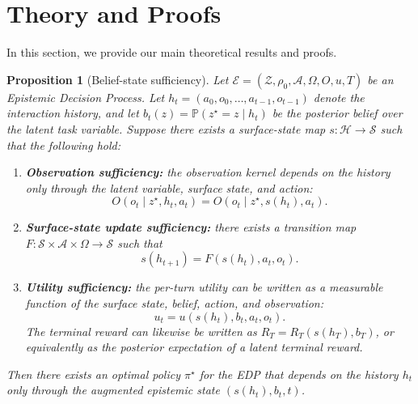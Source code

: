 \documentclass[11pt]{article}
\theoremstyle{plain}
\newtheorem{proposition}[theorem]{Proposition}
\theoremstyle{definition}
\theoremstyle{remark}
\begin{document}
\appendix

\section{Theory and Proofs}
\label{app:proofs}
In this section, we provide our main theoretical results and proofs. 
\begin{proposition}[Belief-state sufficiency]
\label{prop:belief-state-sufficiency}
Let \(\mathcal{E}=(\mathcal{Z},\rho_0,\mathcal{A},\Omega,O,u,T)\) be an Epistemic Decision Process. Let \(h_t=(a_0,o_0,\ldots,a_{t-1},o_{t-1})\) denote the interaction history, and let \(b_t(z)=\mathbb{P}(z^\star=z\mid h_t)\) be the posterior belief over the latent task variable. Suppose there exists a surface-state map \(s:\mathcal{H}\rightarrow\mathcal{S}\) such that the following hold:
\begin{enumerate}
    \item \textbf{Observation sufficiency:} the observation kernel depends on the history only through the latent variable, surface state, and action:
    \[
        O(o_t\mid z^\star,h_t,a_t)=O(o_t\mid z^\star,s(h_t),a_t).
    \]
    \item \textbf{Surface-state update sufficiency:} there exists a transition map \(F:\mathcal{S}\times\mathcal{A}\times\Omega\rightarrow\mathcal{S}\) such that
    \[
        s(h_{t+1})=F(s(h_t),a_t,o_t).
    \]
    \item \textbf{Utility sufficiency:} the per-turn utility can be written as a measurable function of the surface state, belief, action, and observation:
    \[
        u_t=u(s(h_t),b_t,a_t,o_t).
    \]
    The terminal reward can likewise be written as \(R_T=R_T(s(h_T),b_T)\), or equivalently as the posterior expectation of a latent terminal reward.
\end{enumerate}
Then there exists an optimal policy $\pi^\star$ for the EDP that depends on the history \(h_t\) only through the augmented epistemic state \((s(h_t),b_t,t)\).
\end{proposition}
\end{document}
